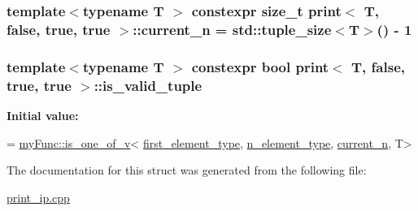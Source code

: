 \subsubsection[{\texorpdfstring{current\+\_\+n}{current_n}}]{\setlength{\rightskip}{0pt plus 5cm}template$<$typename T $>$ constexpr size\+\_\+t {\bf print}$<$ T, false, true, true $>$\+::current\+\_\+n = std\+::tuple\+\_\+size$<$T$>$() -\/ 1\hspace{0.3cm}{\ttfamily [static]}}\hypertarget{structprint_3_01T_00_01false_00_01true_00_01true_01_4_a1b88695798454d00772ed00dde4f10b8}{}\label{structprint_3_01T_00_01false_00_01true_00_01true_01_4_a1b88695798454d00772ed00dde4f10b8}
\subsubsection[{\texorpdfstring{is\+\_\+valid\+\_\+tuple}{is_valid_tuple}}]{\setlength{\rightskip}{0pt plus 5cm}template$<$typename T $>$ constexpr bool {\bf print}$<$ T, false, true, true $>$\+::is\+\_\+valid\+\_\+tuple\hspace{0.3cm}{\ttfamily [static]}}\hypertarget{structprint_3_01T_00_01false_00_01true_00_01true_01_4_ac26cb1e1f2d4e622fc9bd7ba97555dc4}{}\label{structprint_3_01T_00_01false_00_01true_00_01true_01_4_ac26cb1e1f2d4e622fc9bd7ba97555dc4}
{\bfseries Initial value\+:}
\begin{DoxyCode}
= \hyperlink{namespacemyFunc_aa757a804546f113b7cadf75b0a1ec7e1}{myFunc::is\_one\_of\_v}<
            \hyperlink{structprint_3_01T_00_01false_00_01true_00_01true_01_4_a2dae0d9d3db0a28ae73051bef2394aaa}{first\_element\_type},
            \hyperlink{structprint_3_01T_00_01false_00_01true_00_01true_01_4_a6b6bfb81869a40026880ebd0d82cd25a}{n\_element\_type},
            \hyperlink{structprint_3_01T_00_01false_00_01true_00_01true_01_4_a1b88695798454d00772ed00dde4f10b8}{current\_n},
            T>
\end{DoxyCode}


The documentation for this struct was generated from the following file\+:\begin{DoxyCompactItemize}
\item 
\hyperlink{print__ip_8cpp}{print\+\_\+ip.\+cpp}\end{DoxyCompactItemize}
